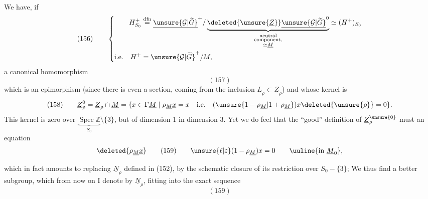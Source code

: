 We have, if
\[
(156)\qquad\left\{
\begin{aligned}
H^+_{S_0}&\overset{\mathrm{dfn}}{=}
\underline{\unsure{\mathcal G|\widetilde G}}^{+}/
\underbrace{\deleted{\unsure{\underline Z}}\underline{\unsure{\mathcal G|\widetilde G}}^{0}}_{\substack{\text{neutral}\\\text{component,}\\\simeq\underline M}}
\simeq(H^+)_{S_0}\\
\text{i.e.}\quad H^+&=\unsure{\mathcal G|\widetilde G}^{+}/M,
\end{aligned}\right.
\]
a canonical homomorphism
\[
(157)
\]
which is an epimorphism (since there is even a section, coming from the inclusion $\underline L_\rho\subset\underline Z_\rho$) and whose kernel is
\[
(158)\qquad
\underline Z_\rho^0=\underline Z_\rho\cap\underline M
=\{x\in\Gamma\underline M\mid\rho_{\underline M}\underline x=x\quad\text{i.e.}\quad(\unsure{1-\rho_{\underline M}|1+\rho_{\underline M}})x\deleted{\unsure{\rho}}=0\}.
\]
This kernel is zero over $\underbrace{\operatorname{Spec}\mathbb Z}_{S_0}\setminus\{3\}$,
but of dimension $1$ in dimension $3$. Yet we do feel that the ``good'' definition of $\underline Z_\rho^{\unsure{0}}$  must  an equation
\[
\deleted{\rho_{\underline M}\underline x}\qquad
(159)\qquad \unsure{\ell|\varepsilon}(1-\rho_{\underline M})x=0\qquad\uuline{\text{in }\underline M_0},
\]


which in fact amounts  to replacing $\underline N_\rho$ defined in (152), by the schematic closure of its restriction over $S_0-\{3\}$; We thus find a better subgroup, which from now on I denote by $\underline N_\rho$, fitting into the exact sequence
\[
(159)
\]

